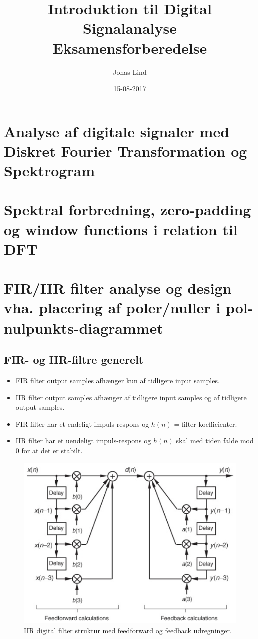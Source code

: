 \documentclass[danish]{article}
\begin{document}
\title{\textbf{Introduktion til Digital Signalanalyse }   Eksamensforberedelse}
\author{Jonas Lind}
\date{15-08-2017}
\maketitle
\section{Analyse af digitale signaler med Diskret Fourier Transformation og Spektrogram}
\newpage
\section{Spektral forbredning, zero-padding og window functions i relation til DFT}
\newpage
\section{FIR/IIR filter analyse og design vha. placering af poler/nuller i pol-nulpunkts-diagrammet}

\subsection{FIR- og IIR-filtre generelt}
\begin{itemize} 
	\item FIR filter output samples afhænger kun af tidligere input samples.
	\item IIR filter output samples afhænger af tidligere input samples og af tidligere  output samples.
	\item FIR filter har et endeligt impuls-respons og $h(n)$ = filter-koefficienter.
	\item IIR filter har et uendeligt impuls-respons og $h(n)$ skal med tiden falde mod 0 for at det er stabilt. 
\end{itemize}

\begin{figure}[H]
	\centering
	\includegraphics[width=0.6\linewidth]{graphics/iir}
	\caption{IIR digital filter struktur med feedforward og feedback udregninger.}
	\label{fig:iir}
\end{figure}
\end{document}
